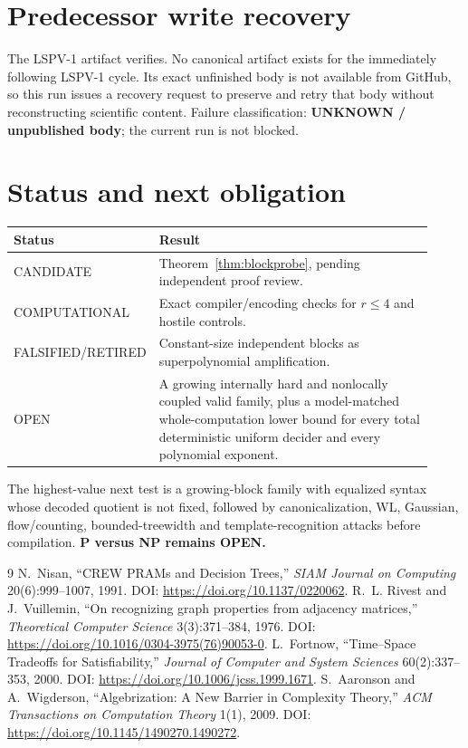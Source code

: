 \documentclass[11pt]{article}
\begin{document}
\section{Predecessor write recovery}
The LSPV-1 artifact
verifies.  No canonical artifact exists for the immediately following LSPV-1
cycle.  Its exact unfinished body is not available from GitHub, so this run
issues a recovery request to preserve and retry that body without reconstructing
scientific content.  Failure classification: \textbf{UNKNOWN / unpublished
body}; the current run is not blocked.

\section{Status and next obligation}
\begin{center}
\begin{tabular}{p{0.20\linewidth}p{0.72\linewidth}}
\toprule
Status & Result\\
\midrule
CANDIDATE & Theorem~\ref{thm:blockprobe}, pending independent proof review.\\
COMPUTATIONAL & Exact compiler/encoding checks for $r\le4$ and hostile controls.\\
FALSIFIED/RETIRED & Constant-size independent blocks as superpolynomial amplification.\\
OPEN & A growing internally hard and nonlocally coupled valid family, plus a
model-matched whole-computation lower bound for every total deterministic
uniform decider and every polynomial exponent.\\
\bottomrule
\end{tabular}
\end{center}

The highest-value next test is a growing-block family with equalized syntax
whose decoded quotient is not fixed, followed by canonicalization, WL,
Gaussian, flow/counting, bounded-treewidth and template-recognition attacks
before compilation.  \textbf{P versus NP remains OPEN.}

\begin{thebibliography}{9}
N.~Nisan, ``CREW PRAMs and Decision Trees,'' \emph{SIAM Journal on Computing}
20(6):999--1007, 1991. DOI: \url{https://doi.org/10.1137/0220062}.
R.~L. Rivest and J.~Vuillemin, ``On recognizing graph properties from
adjacency matrices,'' \emph{Theoretical Computer Science} 3(3):371--384,
1976. DOI: \url{https://doi.org/10.1016/0304-3975(76)90053-0}.
L.~Fortnow, ``Time--Space Tradeoffs for Satisfiability,'' \emph{Journal of
Computer and System Sciences} 60(2):337--353, 2000.
DOI: \url{https://doi.org/10.1006/jcss.1999.1671}.
S.~Aaronson and A.~Wigderson, ``Algebrization: A New Barrier in Complexity
Theory,'' \emph{ACM Transactions on Computation Theory} 1(1), 2009.
DOI: \url{https://doi.org/10.1145/1490270.1490272}.
\end{thebibliography}
\end{document}
